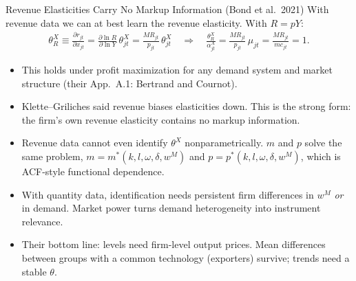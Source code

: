 \documentclass[aspectratio=169,10pt]{beamer}
\begin{document}
\begin{frame}{Revenue Elasticities Carry No Markup Information (Bond et al.\ 2021)}
With revenue data we can at best learn the \alert{revenue} elasticity. With $R = pY$:
\begin{align*}
\theta^X_R \equiv \frac{\partial r_{jt}}{\partial x_{jt}} = \frac{\partial \ln R}{\partial \ln Y}\,\theta^X_{jt} = \frac{MR_{jt}}{p_{jt}}\,\theta^X_{jt}
\quad\Longrightarrow\quad
\frac{\theta^X_R}{\alpha^X_{jt}} = \frac{MR_{jt}}{p_{jt}}\,\mu_{jt} = \frac{MR_{jt}}{mc_{jt}} = 1.
\end{align*}
\begin{itemize}
\item This holds under profit maximization for \alert{any} demand system and market structure (their App.\ A.1: Bertrand and Cournot).
\item Klette--Griliches said revenue biases elasticities down. This is the strong form: the firm's own revenue elasticity contains no markup information.
\item Revenue data cannot even identify $\theta^X$ nonparametrically. $m$ and $p$ solve the same problem, $m = m^*(k,l,\omega,\delta,w^M)$ and $p = p^*(k,l,\omega,\delta,w^M)$, which is ACF-style functional dependence.
\item With quantity data, identification needs persistent firm differences in $w^M$ \emph{or} in demand. Market power turns demand heterogeneity into instrument relevance.
\item Their bottom line: \alert{levels need firm-level output prices}. Mean differences between groups with a common technology (exporters) survive; trends need a stable $\theta$.
\end{itemize}
\end{frame}
\end{document}
